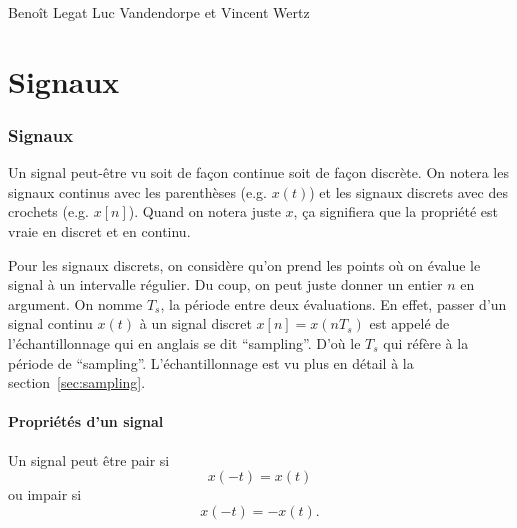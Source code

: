 

\usepackage{pgfplots}
\newcommand{\fourier}{\mathcal{F}}
\newcommand{\laplace}{\mathcal{L}}
\newcommand{\laplacu}{\mathcal{L}_u}
\newcommand{\transfz}{\mathcal{Z}}
\newcommand{\transzu}{\mathcal{Z}_u}
\newcommand{\roc}{\mathrm{ROC}}
\DeclareMathOperator{\cof}{cof}

{Beno\^it Legat}
{Luc Vandendorpe et Vincent Wertz}



\part{Signaux}
\section{Signaux}
Un signal peut-être vu soit de façon continue soit de façon discrète.
On notera les signaux continus avec les parenthèses (e.g. $x(t)$)
et les signaux discrets avec des crochets (e.g. $x[n]$).
Quand on notera juste $x$, ça signifiera que la propriété est vraie
en discret et en continu.

Pour les signaux discrets, on considère qu'on prend les points où on
évalue le signal à un intervalle régulier.
Du coup, on peut juste donner un entier $n$ en argument.
On nomme $T_s$, la période entre deux évaluations.
En effet, passer d'un signal continu $x(t)$ à un signal discret
$x[n] = x(nT_s)$ est appelé de l'échantillonnage qui en anglais se dit
``sampling''. D'où le $T_s$ qui réfère à la période de ``sampling''.
L'échantillonnage est vu plus en détail à la section~\ref{sec:sampling}.

\subsection{Propriétés d'un signal}
Un signal peut être pair si
\[ x(-t) = x(t) \]
ou impair si
\[ x(-t) = -x(t). \]

